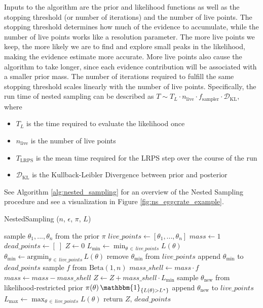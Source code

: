\documentclass[12pt, a4paper]{report}
\begin{document}
Inputs to the algorithm are the prior and likelihood functions as well as the stopping threshold (or number of iterations) and the number of live points.
The stopping threshold determines how much of the evidence to accumulate, while the number of live points works like a resolution parameter.
The more live points we keep, the more likely we are to find and explore small peaks in the likelihood, making the evidence estimate more accurate.
More live points also cause the algorithm to take longer, since each evidence contribution will be associated with a smaller prior mass.
The number of iterations required to fulfill the same stopping threshold scales linearly with the number of live points.
Specifically, the run time of nested sampling can be described as $T \sim T_L \cdot n_{\textrm{live}} \cdot f_{\textrm{sampler}} \cdot \mathcal{D}_{\textrm{KL}}$, where
\begin{itemize}
    \item $T_L$ is the time required to evaluate the likelihood once
    \item $n_{\textrm{live}}$ is the number of live points
    \item $T_{\textrm{LRPS}}$ is the mean time required for the LRPS step over the course of the run
    \item $\mathcal{D}_{\textrm{KL}}$ is the Kullback-Leibler Divergence between prior and posterior \cite[1]{nested_sampling_talk}
\end{itemize}
See Algorithm \ref{alg:nested_sampling} for an overview of the Nested Sampling procedure and see a visualization in Figure \ref{fig:ns_eggcrate_example}.

\begin{algorithm}
    \caption[The basic Nested Sampling algorithm.]{NestedSampling ($n$, $\epsilon$, $\pi$, $L$)}
    \label{alg:nested_sampling}
    \begin{algorithmic}
        \State sample $\theta_1, ..., \theta_n$ from the prior $\pi$
        \State $live\_points \gets [ \theta_1, ..., \theta_n ]$
        \State $mass \gets 1$
        \State $dead\_points \gets [ \; ]$
        \State $Z \gets 0$
        \Repeat
            \State $L_{\textrm{min}} \gets \min_{\theta \, \in \, live\_points} L(\theta)$ 
            \State $\theta_{\textrm{min}} \gets \textrm{argmin}_{\theta \, \in \, live\_points} \, L(\theta)$
            \State remove $\theta_{\textrm{min}}$ from $live\_points$
            \State append $\theta_{\textrm{min}}$ to $dead\_points$
            \State sample $f$ from  $\textrm{Beta}(1, n)$
            \State $mass\_shell \gets mass \cdot f$
            \State $mass \gets mass - mass\_shell$
            \State $Z \gets Z + mass\_shell \cdot L_{\textrm{min}}$
            \State sample $\theta_{\textrm{new}}$ from likelihood-restricted prior $\pi(\theta) \, \mathbbm{1}_{\{L(\theta) > L^*\}}$
            \State append $\theta_{\textrm{new}}$ to $live\_points$
            \State $L_{\textrm{max}} \gets \max_{\theta \, \in \, live\_points} L(\theta)$
        \State return $Z,\, dead\_points$
    \end{algorithmic}
\end{algorithm}
\end{document}
